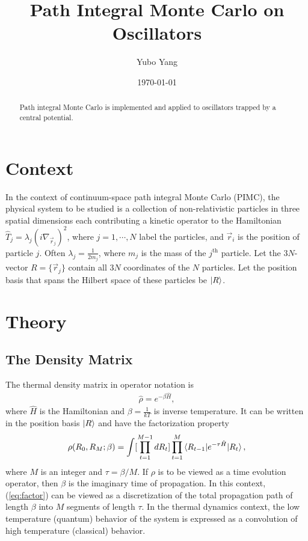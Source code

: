 \documentclass[prl,reprint]{revtex4-1}
\begin{document}
\title{Path Integral Monte Carlo on Oscillators}
\author{Yubo Yang}

\newcommand{\tr}{\text{tr}}

\date{\today}
\begin{abstract}
Path integral Monte Carlo is implemented and applied to oscillators trapped by a central potential. 
\end{abstract}
\maketitle
\section{Context}
In the context of continuum-space path integral Monte Carlo (PIMC), the physical system to be studied is a collection of non-relativistic particles in three spatial dimensions each contributing a kinetic operator to the Hamiltonian $\hat{T}_j=\lambda_j(i\nabla_{\vec{r}_j})^2$, where $j=1,\cdots,N$ label the particles, and $\vec{r}_i$ is the position of particle $j$. Often $\lambda_j=\frac{1}{2m_j}$, where $m_j$ is the mass of the $j^{\text{th}}$ particle. Let the $3N$-vector $R=\{\vec{r}_j\}$ contain all $3N$ coordinates of the $N$ particles. Let the position basis that spans the Hilbert space of these particles be $\ket{R}$.

\section{Theory}
\subsection{The Density Matrix}
The thermal density matrix in operator notation is
\begin{align}
\hat{\rho} = e^{-\beta\hat{H}},
\end{align}
where $\hat{H}$ is the Hamiltonian and $\beta=\frac{1}{kT}$ is inverse temperature. It can be written in the position basis $\ket{R}$ and have the factorization property
\begin{align}
\rho(R_0,R_M;\beta)=\int[\prod_{t=1}^{M-1} dR_t]\prod_{t=1}^{M} \braket{R_{t-1}|e^{-\tau \hat{H}}|R_t}, \label{eq:factor}
\end{align}
where $M$ is an integer and $\tau=\beta/M$. If $\rho$ is to be viewed as a time evolution operator, then $\beta$ is the imaginary time of propagation. In this context, (\ref{eq:factor}) can be viewed as a discretization of the total propagation path of length $\beta$ into $M$ segments of length $\tau$. In the thermal dynamics context, the low temperature (quantum) behavior of the system is expressed as a convolution of high temperature (classical) behavior.
  
\end{document}
